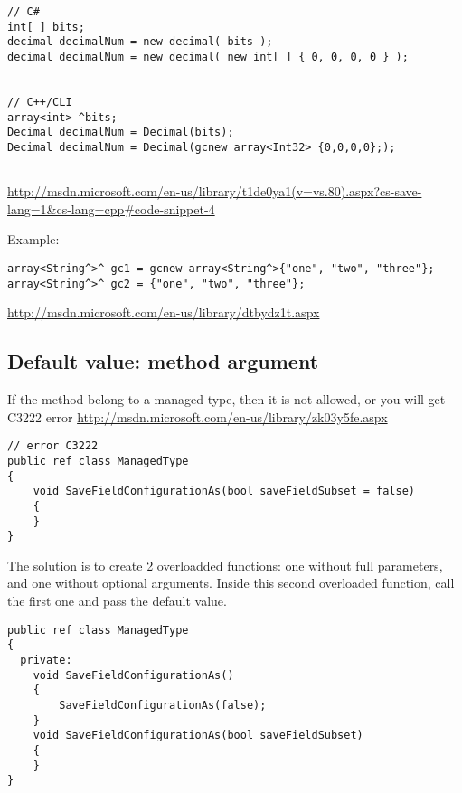 \begin{verbatim}
// C#
int[ ] bits;
decimal decimalNum = new decimal( bits );
decimal decimalNum = new decimal( new int[ ] { 0, 0, 0, 0 } );


// C++/CLI
array<int> ^bits;
Decimal decimalNum = Decimal(bits);
Decimal decimalNum = Decimal(gcnew array<Int32> {0,0,0,0};);
 
\end{verbatim}
\url{http://msdn.microsoft.com/en-us/library/t1de0ya1(v=vs.80).aspx?cs-save-lang=1&cs-lang=cpp#code-snippet-4}

Example:
\begin{verbatim}
array<String^>^ gc1 = gcnew array<String^>{"one", "two", "three"};
array<String^>^ gc2 = {"one", "two", "three"};
\end{verbatim}
\url{http://msdn.microsoft.com/en-us/library/dtbydz1t.aspx}


\subsection{Default value: method argument}

If the method belong to a managed type, then it is not allowed, or you will get
C3222 error \url{http://msdn.microsoft.com/en-us/library/zk03y5fe.aspx}
\begin{verbatim}
// error C3222
public ref class ManagedType
{
	void SaveFieldConfigurationAs(bool saveFieldSubset = false)
	{
	}
}
\end{verbatim}
The solution is to create 2 overloadded functions: one without full parameters,
and one without optional arguments. Inside this second overloaded function,
call the first one and pass the default value.

\begin{verbatim}
public ref class ManagedType
{
  private:
	void SaveFieldConfigurationAs()
    {
		SaveFieldConfigurationAs(false);
	}
	void SaveFieldConfigurationAs(bool saveFieldSubset)
	{
	}
}
\end{verbatim}
% 

